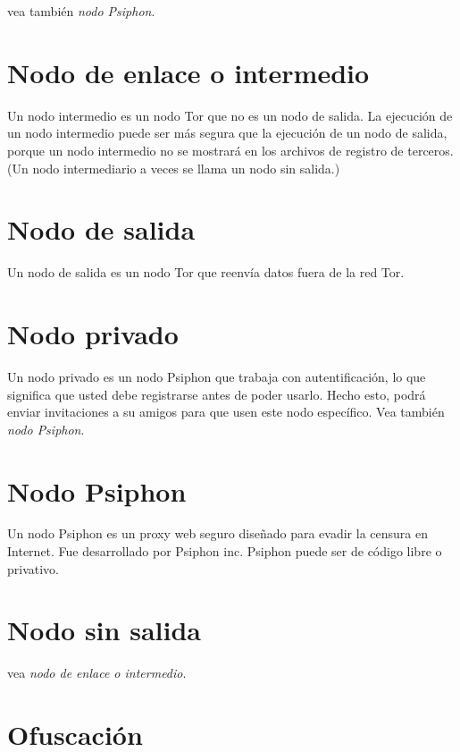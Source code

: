 \documentclass[10pt,a5paper,twoside,,]{book}
\begin{document}
vea también \emph{nodo Psiphon}.

\section{Nodo de enlace o intermedio}\label{nodo-de-enlace-o-intermedio}

Un nodo intermedio es un nodo Tor que no es un nodo de salida. La
ejecución de un nodo intermedio puede ser más segura que la ejecución de
un nodo de salida, porque un nodo intermedio no se mostrará en los
archivos de registro de terceros. (Un nodo intermediario a veces se
llama un nodo sin salida.)

\section{Nodo de salida}\label{nodo-de-salida}

Un nodo de salida es un nodo Tor que reenvía datos fuera de la red Tor.

\section{Nodo privado}\label{nodo-privado}

Un nodo privado es un nodo Psiphon que trabaja con autentificación, lo
que significa que usted debe registrarse antes de poder usarlo. Hecho
esto, podrá enviar invitaciones a su amigos para que usen este nodo
específico. Vea también \emph{nodo Psiphon}.

\section{Nodo Psiphon}\label{nodo-psiphon}

Un nodo Psiphon es un proxy web seguro diseñado para evadir la censura
en Internet. Fue desarrollado por Psiphon inc. Psiphon puede ser de
código libre o privativo.

\section{Nodo sin salida}\label{nodo-sin-salida}

vea \emph{nodo de enlace o intermedio}.

\section{Ofuscación}\label{ofuscaciuxf3n}
\end{document}
